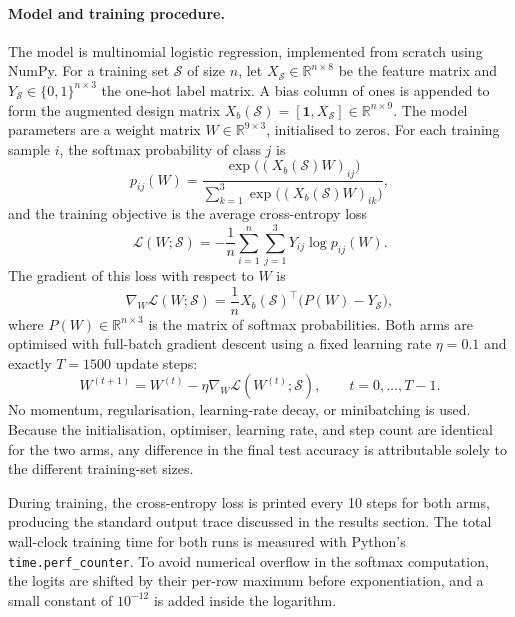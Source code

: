 \documentclass{article}
\begin{document}
\paragraph{Model and training procedure.}
The model is multinomial logistic regression, implemented from scratch using NumPy. For a training set \(\mathcal{S}\) of size \(n\), let \(X_{\mathcal{S}} \in \mathbb{R}^{n \times 8}\) be the feature matrix and \(Y_{\mathcal{S}} \in \{0,1\}^{n \times 3}\) the one-hot label matrix. A bias column of ones is appended to form the augmented design matrix \(X_b(\mathcal{S}) = [\mathbf{1}, X_{\mathcal{S}}] \in \mathbb{R}^{n \times 9}\). The model parameters are a weight matrix \(W \in \mathbb{R}^{9 \times 3}\), initialised to zeros. For each training sample \(i\), the softmax probability of class \(j\) is
\begin{equation}
p_{ij}(W) = \frac{\exp\big((X_b(\mathcal{S}) W)_{ij}\big)}
{\sum_{k=1}^{3} \exp\big((X_b(\mathcal{S}) W)_{ik}\big)},
\end{equation}
and the training objective is the average cross-entropy loss
\begin{equation}
\mathcal{L}(W; \mathcal{S}) = - \frac{1}{n} \sum_{i=1}^{n} \sum_{j=1}^{3} Y_{ij} \log p_{ij}(W).
\end{equation}
The gradient of this loss with respect to \(W\) is
\begin{equation}
\nabla_W \mathcal{L}(W; \mathcal{S}) = \frac{1}{n} X_b(\mathcal{S})^\top \big(P(W) - Y_{\mathcal{S}}\big),
\end{equation}
where \(P(W) \in \mathbb{R}^{n \times 3}\) is the matrix of softmax probabilities. Both arms are optimised with full-batch gradient descent using a fixed learning rate \(\eta = 0.1\) and exactly \(T = 1500\) update steps:
\begin{equation}
W^{(t+1)} = W^{(t)} - \eta \nabla_W \mathcal{L}(W^{(t)}; \mathcal{S}), \qquad t = 0, \ldots, T-1.
\end{equation}
No momentum, regularisation, learning-rate decay, or minibatching is used. Because the initialisation, optimiser, learning rate, and step count are identical for the two arms, any difference in the final test accuracy is attributable solely to the different training-set sizes.

During training, the cross-entropy loss is printed every 10 steps for both arms, producing the standard output trace discussed in the results section. The total wall-clock training time for both runs is measured with Python's \texttt{time.perf\_counter}. To avoid numerical overflow in the softmax computation, the logits are shifted by their per-row maximum before exponentiation, and a small constant of \(10^{-12}\) is added inside the logarithm.
\end{document}
